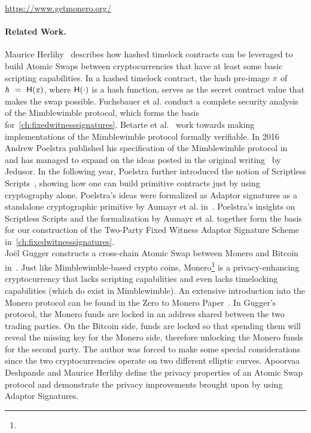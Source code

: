 \urldef{\urlmonero}\url{https://www.getmonero.org/}

\paragraph{Related Work.} Maurice Herlihy~\cite{herlihy2018atomic} describes how hashed timelock contracts can be leveraged to build Atomic Swaps between cryptocurrencies that have at least some basic scripting capabilities.
In a hashed timelock contract, the hash pre-image $\mathit{x}$ of $\mathit{h} ~=~ \mathsf{H} (\mathit{x})$, where $\mathsf{H} (\cdot)$ is a hash function, serves as the secret contract value that makes the swap possible.
Fuchsbauer et al. conduct a complete security analysis of the Mimblewimble protocol, which forms the basis for~\cref{ch:fixedwitnesssignatures}.
Betarte et al.~\cite{betarte2019towards} work towards making implementations of the Mimblewimble protocol formally verifiable.
In 2016 Andrew Poelstra published his specification of the Mimblewimble protocol in~\cite{poelstra2016mimblewimble} and has managed to expand on the ideas posted in the original writing~\cite{jedusor2016mimblewimble} by Jedusor.
In the following year, Poelstra further introduced the notion of Scriptless Scripts~\cite{poelstra2017scriptless}, showing how one can build primitive contracts just by using cryptography alone.
Poelstra's ideas were formalized as Adaptor signatures as a standalone cryptographic primitive by Aumayr et al. in~\cite{aumayr2020bitcoinchannels}.
Poelstra's insights on Scriptless Scripts and the formalization by Aumayr et al. together form the basis for our construction of the Two-Party Fixed Witness Adaptor Signature Scheme in~\cref{ch:fixedwitnesssignatures}.\\
Joël Gugger constructs a cross-chain Atomic Swap between Monero and Bitcoin in~\cite{gugger2020bitcoin}.
Just like Mimblewimble-based crypto coins, Monero\footnote{\urlmonero} is a privacy-enhancing cryptocurrency that lacks scripting capabilities and even lacks timelocking capabilities (which do exist in Mimblewimble).
An extensive introduction into the Monero protocol can be found in the Zero to Monero Paper~\cite{alonso2020zero}.
In Gugger's protocol, the Monero funds are locked in an address shared between the two trading parties.
On the Bitcoin side, funds are locked so that spending them will reveal the missing key for the Monero side, therefore unlocking the Monero funds for the second party.
The author was forced to make some special considerations since the two cryptocurrencies operate on two different elliptic curves.
Apoorvaa Deshpande and Maurice Herlihy define the privacy properties of an Atomic Swap protocol and demonstrate the privacy improvements brought upon by using Adaptor Signatures.~\cite{deshpande2020privacy}

